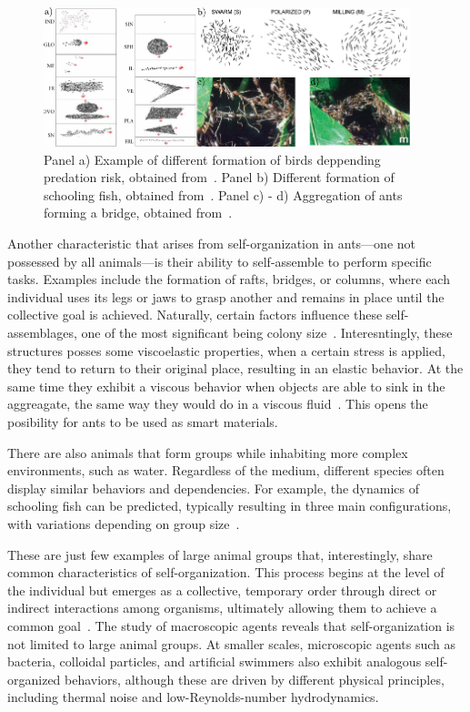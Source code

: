 \begin{figure}
  \begin{center}
    \includegraphics[width=0.95\textwidth]{figures/macroscopicagents.pdf}
  \end{center}
  \caption[Macroscopic Agents example]{Panel a) Example of different formation of birds deppending predation risk, obtained from~\cite{carere2009aerial}. Panel b) Different formation of schooling fish, obtained from~\cite{tunstrom2013collective}. Panel c) - d) Aggregation of ants forming a bridge, obtained from~\cite{anderson2002self}.}\label{fig:macroscopicagents}
\end{figure}


Another characteristic that arises from self-organization in ants—one not possessed by all animals—is their ability to self-assemble to perform specific tasks. Examples include the formation of rafts, bridges, or columns, where each individual uses its legs or jaws to grasp another and remains in place until the collective goal is achieved. Naturally, certain factors influence these self-assemblages, one of the most significant being colony size~\cite{anderson2002self}. Interesntingly, these structures posses some viscoelastic properties, when a certain stress is applied, they tend to return to their original place, resulting in an elastic behavior. At the same time they exhibit a viscous behavior when objects are able to sink in the aggreagate, the same way they would do in a viscous fluid~\cite{tennenbaum2016mechanics}. This opens the posibility for ants to be used as smart materials. 

There are also animals that form groups while inhabiting more complex environments, such as water. Regardless of the medium, different species often display similar behaviors and dependencies. For example, the dynamics of schooling fish can be predicted, typically resulting in three main configurations, with variations depending on group size~\cite{tunstrom2013collective, katz2011inferring, huang2024collective}.

These are just few examples of large animal groups that, interestingly, share common characteristics of self-organization. This process begins at the level of the individual but emerges as a collective, temporary order through direct or indirect interactions among organisms, ultimately allowing them to achieve a common goal~\cite{isaeva2012self}.
The study of macroscopic agents reveals that self-organization is not limited to large animal groups. At smaller scales, microscopic agents such as bacteria, colloidal particles, and artificial swimmers also exhibit analogous self-organized behaviors, although these are driven by different physical principles, including thermal noise and low-Reynolds-number hydrodynamics.

